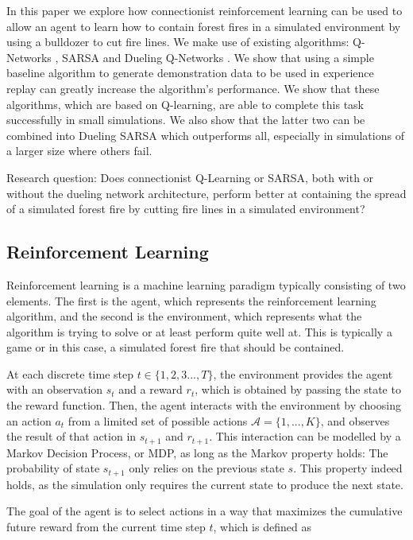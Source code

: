In this paper we explore how connectionist reinforcement learning can be used to allow an agent to learn how to contain forest fires in a simulated environment by using a bulldozer to cut fire lines. We make use of existing algorithms: Q-Networks \citep{watkins1989learning}, SARSA \citep{rummery1994line} and Dueling Q-Networks \citep{wang2015dueling}. We show that using a simple baseline algorithm to generate demonstration data to be used in experience replay can greatly increase the algorithm's performance. We show that these algorithms, which are based on Q-learning, are able to complete this task successfully in small simulations. We also show that the latter two can be combined into Dueling SARSA which outperforms all, especially in simulations of a larger size where others fail.

Research question: Does connectionist Q-Learning or SARSA, both with or without the dueling network architecture, perform better at containing the spread of a simulated forest fire by cutting fire lines in a simulated environment?

\subsection{Reinforcement Learning}\label{sec:reinforcementlearning}
Reinforcement learning is a machine learning paradigm typically consisting of two elements. The first is the agent, which represents the reinforcement learning algorithm, and the second is the environment, which represents what the algorithm is trying to solve or at least perform quite well at. This is typically a game or in this case, a simulated forest fire that should be contained.


At each discrete time step $t \in \{1,2,3...,T\}$, the environment provides the agent with an observation $s_t$ and a reward $r_t$, which is obtained by passing the state to the reward function. Then, the agent interacts with the environment by choosing an action $a_t$ from a limited set of possible actions $\mathcal{A}=\{1,...,K\}$, and observes the result of that action in $s_{t+1}$ and $r_{t+1}$. This interaction can be modelled by a Markov Decision Process, or MDP, as long as the Markov property holds: The probability of state $s_{t+1}$ only relies on the previous state $s$. This property indeed holds, as the simulation only requires the current state to produce the next state.

The goal of the agent is to select actions in a way that maximizes the cumulative future reward from the current time step $t$, which is defined as 

